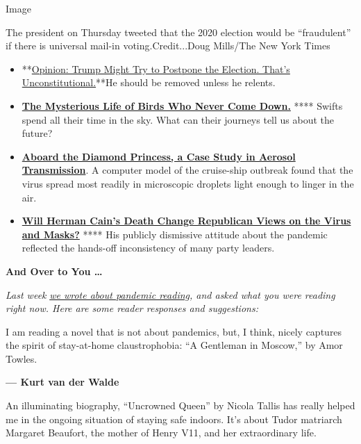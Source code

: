 Image

The president on Thursday tweeted that the 2020 election would be
``fraudulent'' if there is universal mail-in voting.Credit...Doug
Mills/The New York Times

\begin{itemize}
\item
  **\href{https://www.nytimes3xbfgragh.onion/2020/07/30/opinion/trump-delay-election-coronavirus.html}{Opinion:
  Trump Might Try to Postpone the Election. That's
  Unconstitutional.}**He should be removed unless he relents.
\item
  \textbf{\href{https://www.nytimes3xbfgragh.onion/2020/07/29/magazine/vesper-flights.html?action=click\&module=Editors\%20Picks\&pgtype=Homepage}{The
  Mysterious Life of Birds Who Never Come Down.}} **** Swifts spend all
  their time in the sky. What can their journeys tell us about the
  future?
\item
  \textbf{\href{https://www.nytimes3xbfgragh.onion/2020/07/30/health/diamond-princess-coronavirus-aerosol.html}{Aboard
  the Diamond Princess, a Case Study in Aerosol Transmission}}. A
  computer model of the cruise-ship outbreak found that the virus spread
  most readily in microscopic droplets light enough to linger in the
  air.
\item
  \textbf{\href{https://www.nytimes3xbfgragh.onion/2020/07/30/us/politics/herman-cain-gop-coronavirus.html}{Will
  Herman Cain's Death Change Republican Views on the Virus and Masks?}}
  **** His publicly dismissive attitude about the pandemic reflected the
  hands-off inconsistency of many party leaders.
\end{itemize}

\textbf{And Over to You \ldots{}}

\emph{Last week}
\href{https://www.nytimes3xbfgragh.onion/2020/07/24/world/australia/divisions-decency-and-the-plague.html}{\emph{we
wrote about pandemic reading}}\emph{, and asked what you were reading
right now. Here are some reader responses and suggestions:}

I am reading a novel that is not about pandemics, but, I think, nicely
captures the spirit of stay-at-home claustrophobia: ``A Gentleman in
Moscow,'' by Amor Towles.

\textbf{--- Kurt van der Walde}

An illuminating biography, ``Uncrowned Queen'' by Nicola Tallis has
really helped me in the ongoing situation of staying safe indoors. It's
about Tudor matriarch Margaret Beaufort, the mother of Henry V11, and
her extraordinary life.

